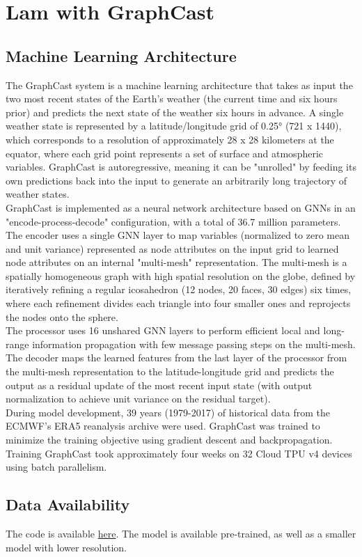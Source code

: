 \section{Lam with GraphCast}

\subsection{Machine Learning Architecture}

The GraphCast system is a machine learning architecture that takes as input the two most recent states of the Earth's weather (the current time and six hours prior) and predicts the next state of the weather six hours in advance. A single weather state is represented by a latitude/longitude grid of 0.25° (721 x 1440), which corresponds to a resolution of approximately 28 x 28 kilometers at the equator, where each grid point represents a set of surface and atmospheric variables. GraphCast is autoregressive, meaning it can be "unrolled" by feeding its own predictions back into the input to generate an arbitrarily long trajectory of weather states.\\

GraphCast is implemented as a neural network architecture based on GNNs in an "encode-process-decode" configuration, with a total of 36.7 million parameters. The encoder uses a single GNN layer to map variables (normalized to zero mean and unit variance) represented as node attributes on the input grid to learned node attributes on an internal "multi-mesh" representation. The multi-mesh is a spatially homogeneous graph with high spatial resolution on the globe, defined by iteratively refining a regular icosahedron (12 nodes, 20 faces, 30 edges) six times, where each refinement divides each triangle into four smaller ones and reprojects the nodes onto the sphere.\\

The processor uses 16 unshared GNN layers to perform efficient local and long-range information propagation with few message passing steps on the multi-mesh. The decoder maps the learned features from the last layer of the processor from the multi-mesh representation to the latitude-longitude grid and predicts the output as a residual update of the most recent input state (with output normalization to achieve unit variance on the residual target).\\

During model development, 39 years (1979-2017) of historical data from the ECMWF's ERA5 reanalysis archive were used. GraphCast was trained to minimize the training objective using gradient descent and backpropagation. Training GraphCast took approximately four weeks on 32 Cloud TPU v4 devices using batch parallelism.\\

\subsection{Data Availability}

The code is available \href{https://github.com/google-deepmind/graphcast}{here}. The model is available pre-trained, as well as a smaller model with lower resolution.